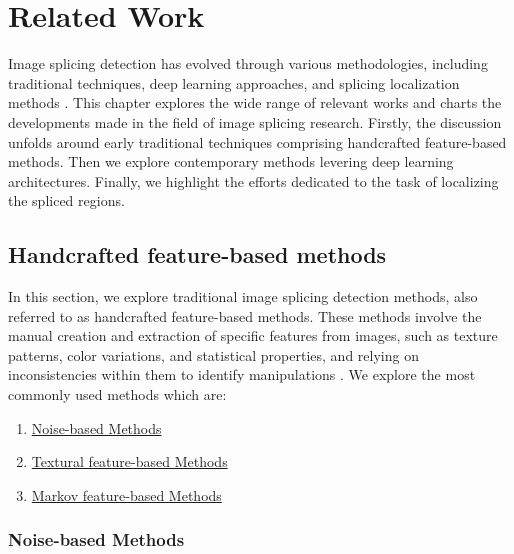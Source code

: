 \chapter{Related Work}\label{chap:related}

Image splicing detection has evolved through various methodologies, including traditional techniques, deep learning approaches, and splicing localization methods \cite{Khazaal2022}. This chapter explores the wide range of relevant works and charts the developments made in the field of image splicing research. Firstly, the discussion unfolds around early traditional techniques comprising handcrafted feature-based methods. Then we explore contemporary methods levering deep learning architectures. Finally, we highlight the efforts dedicated to the task of localizing the spliced regions.


  \section{Handcrafted feature-based methods} \label{sec:s1}
  
In this section, we explore traditional image splicing detection methods, also referred to as handcrafted feature-based methods. These methods involve the manual creation and extraction of specific features from images, such as texture patterns, color variations, and statistical properties, and relying on inconsistencies within them to identify manipulations \cite{Ma_Jiang_Fan_Jiang_Yan_2020}. We explore the most commonly \cite{MeenaTyagi2021} used methods which are: 
\begin{enumerate}
  \item \hyperref[sec:ss1]{Noise-based Methods}
  \item \hyperref[sec:ss2]{Textural feature-based Methods}
  \item \hyperref[sec:ss3]{Markov feature-based Methods}
\end{enumerate}

\subsection{Noise-based Methods} \label{sec:ss1}

